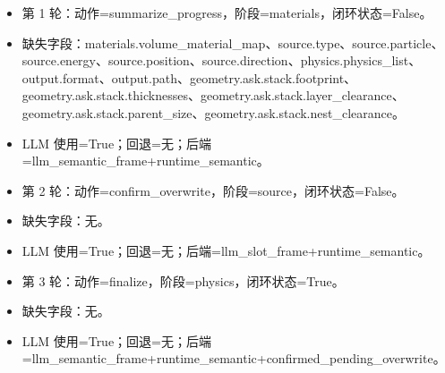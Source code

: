 \documentclass[11pt]{ctexart}
\begin{document}
\begin{itemize}
\item 第 1 轮：动作=summarize\_progress，阶段=materials，闭环状态=False。
\item 缺失字段：materials.volume\_material\_map、source.type、source.particle、source.energy、source.position、source.direction、physics.physics\_list、output.format、output.path、geometry.ask.stack.footprint、geometry.ask.stack.thicknesses、geometry.ask.stack.layer\_clearance、geometry.ask.stack.parent\_size、geometry.ask.stack.nest\_clearance。
\item LLM 使用=True；回退=无；后端=llm\_semantic\_frame+runtime\_semantic。
\item 第 2 轮：动作=confirm\_overwrite，阶段=source，闭环状态=False。
\item 缺失字段：无。
\item LLM 使用=True；回退=无；后端=llm\_slot\_frame+runtime\_semantic。
\item 第 3 轮：动作=finalize，阶段=physics，闭环状态=True。
\item 缺失字段：无。
\item LLM 使用=True；回退=无；后端=llm\_semantic\_frame+runtime\_semantic+confirmed\_pending\_overwrite。
\end{itemize}
\end{document}
